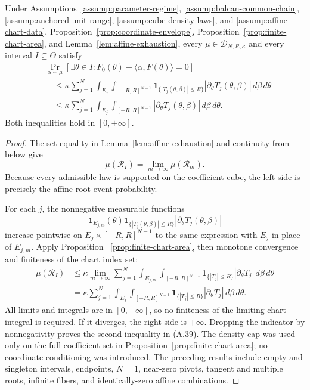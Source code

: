 \begin{proposition}
\label{prop:affine-bound}
Under Assumptions~\ref{assump:parameter-regime},
\ref{assump:balcan-common-chain},
\ref{assump:anchored-unit-range},
\ref{assump:cube-density-laws}, and
\ref{assump:affine-chart-data}, Proposition~\ref{prop:coordinate-envelope},
Proposition~\ref{prop:finite-chart-area}, and
Lemma~\ref{lem:affine-exhaustion}, every
$\mu\in\mathcal D_{N,R,\kappa}$ and every interval $I\subseteq\Theta$
satisfy
\[
\begin{aligned}
&\Pr_{\alpha\sim\mu}
[\exists\theta\in I:F_0(\theta)+\langle\alpha,F(\theta)\rangle=0]\\
&\quad\leq\kappa\sum_{j=1}^N
\int_{E_j}\int_{[-R,R]^{N-1}}
\mathbf1_{\{|T_j(\theta,\beta)|\leq R\}}
|\partial_\theta T_j(\theta,\beta)|\,d\beta\,d\theta\\
&\quad\leq\kappa\sum_{j=1}^N
\int_{E_j}\int_{[-R,R]^{N-1}}
|\partial_\theta T_j(\theta,\beta)|\,d\beta\,d\theta.
\end{aligned}
\tag{A.39}
\]
Both inequalities hold in $[0,+\infty]$.
\end{proposition}

\begin{proof}
The set equality in Lemma~\ref{lem:affine-exhaustion} and continuity from
below \citep{bogachev2007measure} give
\[
\mu(\mathcal R_I)=\lim_{m\to\infty}\mu(\mathcal R_m).
\tag{A.40}
\]
Because every admissible law is supported on the coefficient cube, the left
side is precisely the affine root-event probability.

For each $j$, the nonnegative measurable functions
\[
\mathbf1_{E_{j,m}}(\theta)
\mathbf1_{\{|T_j(\theta,\beta)|\leq R\}}
|\partial_\theta T_j(\theta,\beta)|
\]
increase pointwise on $E_j\times[-R,R]^{N-1}$ to the same expression with
$E_j$ in place of $E_{j,m}$.  Apply Proposition
~\ref{prop:finite-chart-area}, then monotone convergence
\citep{bogachev2007measure} and finiteness of the chart index set:
\[
\begin{aligned}
\mu(\mathcal R_I)
&\leq\kappa\lim_{m\to\infty}\sum_{j=1}^N
\int_{E_{j,m}}\int_{[-R,R]^{N-1}}
\mathbf1_{\{|T_j|\leq R\}}|\partial_\theta T_j|
\,d\beta\,d\theta\\
&=\kappa\sum_{j=1}^N
\int_{E_j}\int_{[-R,R]^{N-1}}
\mathbf1_{\{|T_j|\leq R\}}|\partial_\theta T_j|
\,d\beta\,d\theta.
\end{aligned}
\tag{A.41}
\]
All limits and integrals are in $[0,+\infty]$, so no finiteness of the
limiting chart integral is required.  If it diverges, the right side is
$+\infty$.  Dropping the indicator by nonnegativity proves the second
inequality in (A.39).  The density cap was used only on the full coefficient
set in Proposition~\ref{prop:finite-chart-area}; no coordinate conditioning
was introduced.  The preceding results include empty and singleton
intervals, endpoints, $N=1$, near-zero pivots, tangent and multiple roots,
infinite fibers, and identically-zero affine combinations.
\end{proof}

